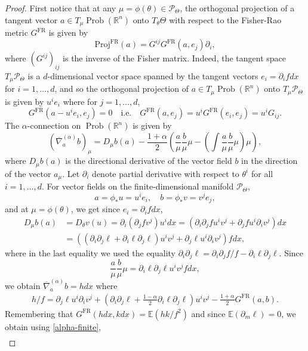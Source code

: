 \documentclass[11pt]{amsart}
\theoremstyle{definition}
\newcommand{\R}{\mathbb R}
\newcommand{\E}{\mathbb E}
\newcommand{\ProbRn}{\operatorname{Prob}(\R^n)}
\newcommand{\GFR}{G^{\mathrm{FR}}}
\newcommand{\nablabar}{\overline{\nabla}}
\begin{document}
\begin{proof}
First notice that at any $\mu=\phi(\theta)\in\mathcal P_\Theta$, the orthogonal projection of a tangent vector $a\in T_\mu\ProbRn$ onto $T_\theta\Theta$ with respect to the Fisher-Rao metric $\GFR$ is given by 
\begin{equation}\label{proj-fr}
\mathrm{Proj}^{\mathrm{FR}}(a)=G^{ij}\GFR(a,e_j)\partial_i,
\end{equation}
where $(G^{ij})_{ij}$ is the inverse of the Fisher matrix. Indeed, the tangent space $T_\mu\mathcal P_\Theta$ is a $d$-dimensional vector space spanned by the tangent vectors $e_i=\partial_i f dx$ for $i=1,\hdots,d$, and so the orthogonal projection of $a\in T_\mu\ProbRn$ onto $T_\mu\mathcal P_\Theta$ is given by $u^ie_i$ where for $j=1,\hdots, d$, 
$$\GFR(a-u^ie_i, e_j)=0 \quad \text{i.e.} \quad \GFR(a,e_j)=u^i\GFR(e_i,e_j)=u^iG_{ij}.$$
The $\alpha$-connection on $\ProbRn$ is given by 
 $$(\nablabar^{(\alpha)}_ab)_\mu=D_\mu b(a)-\frac{1+\alpha}{2}\left(\frac{a}{\mu}\frac{b}{\mu}\mu - \left(\int \frac{a}{\mu}\frac{b}{\mu}\mu\right)\mu\right),$$ 
where $D_\mu b(a)$ is the directional derivative of the vector field $b$ in the direction of the vector $a_\mu$. Let $\partial_i$ denote partial derivative with respect to $\theta^i$ for all $i=1,\hdots,d$. For vector fields on the finite-dimensional manifold $\mathcal P_\Theta$,
$$a=\phi_*u=u^ie_i, \quad b=\phi_*v=v^je_j,$$%
and at $\mu=\phi(\theta)$, we get since $e_i=\partial_if dx$,
\[
\begin{split}
D_\mu b(a)&=D_\theta v(u)=\partial_i(\partial_jf v^j)u^i dx = (\partial_i\partial_j fu^iv^j + \partial_jfu^i\partial_iv^j) dx\\
&=((\partial_i\partial_j \ell + \partial_i\ell\partial_j\ell)u^iv^j + \partial_j\ell u^i\partial_iv^j) f dx,
\end{split}
\]
where in the last equality we used the equality $\partial_i\partial_j\ell = \partial_i\partial_jf/f - \partial_i\ell \partial_j \ell$.
Since 
$$\frac{a}{\mu}\frac{b}{\mu}\mu = \partial_i\ell\partial_j\ell u^iv^j f dx,$$
we obtain $\nablabar^{(\alpha)}_ab=h dx$ where
\begin{align*}
h/f=\partial_j\ell u^i\partial_iv^j + \left(\partial_i\partial_j\ell + \frac{1-\alpha}{2}\partial_i\ell\partial_j\ell\right)u^iv^j - \frac{1+\alpha}{2}\GFR(a,b).
\end{align*}
Remembering that $\GFR(hdx,kdx)=\E(hk/f^2)$ and since $\E(\partial_m\ell)=0$, we obtain using \eqref{alpha-finite},
\begin{align*}

\end{align*}
\end{proof}
\end{document}
